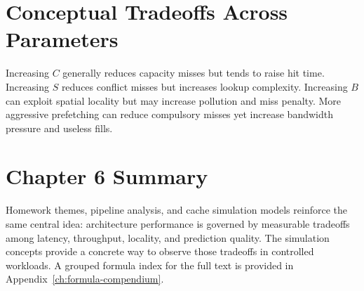 \section{Conceptual Tradeoffs Across Parameters}\label{sec:auto-054}
Increasing $C$ generally reduces capacity misses but tends to raise hit time.
Increasing $S$ reduces conflict misses but increases lookup complexity.
Increasing $B$ can exploit spatial locality but may increase pollution and miss penalty.
More aggressive prefetching can reduce compulsory misses yet increase bandwidth pressure and useless fills.

\section{Chapter 6 Summary}\label{sec:auto-055}
Homework themes, pipeline analysis, and cache simulation models reinforce the same central idea: architecture performance is governed by measurable tradeoffs among latency, throughput, locality, and prediction quality.
The simulation concepts provide a concrete way to observe those tradeoffs in controlled workloads.
A grouped formula index for the full text is provided in Appendix~\ref{ch:formula-compendium}.
